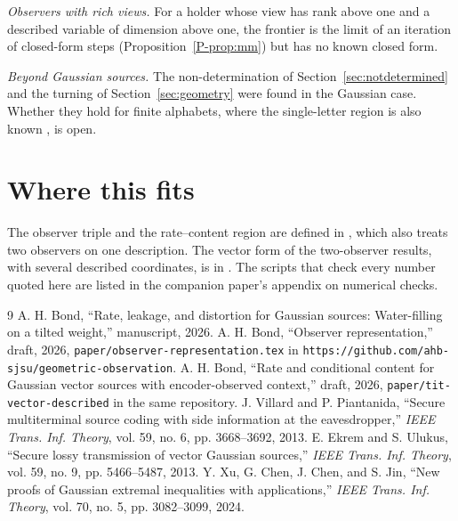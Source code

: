 \documentclass[11pt]{article}
\newcommand{\Pp}[1]{Proposition~\ref{P-#1}}
\begin{document}
\emph{Observers with rich views.} For a holder whose view has rank above
one and a described variable of dimension above one, the frontier is the
limit of an iteration of closed-form steps (\Pp{prop:mm}) but has no
known closed form.

\emph{Beyond Gaussian sources.} The non-determination of
Section~\ref{sec:notdetermined} and the turning of
Section~\ref{sec:geometry} were found in the Gaussian case. Whether they
hold for finite alphabets, where the single-letter region is also known
\cite{villard2013}, is open.

\section*{Where this fits}

The observer triple and the rate--content region are defined in
\cite{obsrep}, which also treats two observers on one description. The
vector form of the two-observer results, with several described
coordinates, is in \cite{vector}. The scripts that check every number
quoted here are listed in the companion paper's appendix on numerical
checks.

\begin{thebibliography}{9}
 A. H. Bond, ``Rate, leakage, and distortion for Gaussian
sources: Water-filling on a tilted weight,'' manuscript, 2026.
 A. H. Bond, ``Observer representation,'' draft, 2026,
\texttt{paper/observer-representation.tex} in
\texttt{https://github.com/ahb-sjsu/geometric-observation}.
 A. H. Bond, ``Rate and conditional content for Gaussian
vector sources with encoder-observed context,'' draft, 2026,
\texttt{paper/tit-vector-described} in the same repository.
 J. Villard and P. Piantanida, ``Secure multiterminal
source coding with side information at the eavesdropper,'' \emph{IEEE
Trans. Inf. Theory}, vol. 59, no. 6, pp. 3668--3692, 2013.
 E. Ekrem and S. Ulukus, ``Secure lossy transmission of
vector Gaussian sources,'' \emph{IEEE Trans. Inf. Theory}, vol. 59,
no. 9, pp. 5466--5487, 2013.
 Y. Xu, G. Chen, J. Chen, and S. Jin, ``New proofs of
Gaussian extremal inequalities with applications,'' \emph{IEEE Trans.
Inf. Theory}, vol. 70, no. 5, pp. 3082--3099, 2024.
\end{thebibliography}
\end{document}
